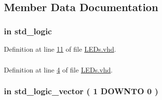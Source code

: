 \subsection{Member Data Documentation}
\hypertarget{class_l_e_ds_a4b5e1e3eba67b2e61c77c9a719d8518c}{}
\subsubsection[{C\+L\+O\+C\+K\+\_\+50}]{ {\bfseries \textcolor{keywordflow}{in}\textcolor{vhdlchar}{ }} {\bfseries \textcolor{comment}{std\+\_\+logic}\textcolor{vhdlchar}{ }} \hspace{0.3cm}{\ttfamily [Port]}}\label{class_l_e_ds_a4b5e1e3eba67b2e61c77c9a719d8518c}


Definition at line \hyperlink{_l_e_ds_8vhd_source_l00011}{11} of file \hyperlink{_l_e_ds_8vhd_source}{L\+E\+Ds.\+vhd}.

\hypertarget{class_l_e_ds_a0a6af6eef40212dbaf130d57ce711256}{}
\subsubsection[{ieee}]{\hspace{0.3cm}{\ttfamily [Library]}}\label{class_l_e_ds_a0a6af6eef40212dbaf130d57ce711256}


Definition at line \hyperlink{_l_e_ds_8vhd_source_l00004}{4} of file \hyperlink{_l_e_ds_8vhd_source}{L\+E\+Ds.\+vhd}.

\hypertarget{class_l_e_ds_aa70bf9245705f33e4529eb81df3fbf94}{}
\subsubsection[{K\+E\+Y}]{ {\bfseries \textcolor{keywordflow}{in}\textcolor{vhdlchar}{ }} {\bfseries \textcolor{comment}{std\+\_\+logic\+\_\+vector}\textcolor{vhdlchar}{ }\textcolor{vhdlchar}{(}\textcolor{vhdlchar}{ }\textcolor{vhdlchar}{ } \textcolor{vhdldigit}{1} \textcolor{vhdlchar}{ }\textcolor{keywordflow}{D\+O\+W\+N\+T\+O}\textcolor{vhdlchar}{ }\textcolor{vhdlchar}{ } \textcolor{vhdldigit}{0} \textcolor{vhdlchar}{ }\textcolor{vhdlchar}{)}\textcolor{vhdlchar}{ }} \hspace{0.3cm}{\ttfamily [Port]}}\label{class_l_e_ds_aa70bf9245705f33e4529eb81df3fbf94}


